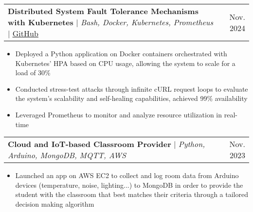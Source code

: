 \documentclass[letterpaper,11t]{article}
\makeatletter
\newcommand{\resumeItem}[1]{
  \item\small{
    {#1 \vspace{-2pt}}
  }
}
\newcommand{\resumeProjectHeading}[2]{
    \item
    \begin{tabular*}{0.97\textwidth}{l@{\extracolsep{\fill}}r}
      \small#1 & #2 \\
    \end{tabular*}\vspace{-7pt}
}
\newcommand{\resumeItemListStart}{\begin{itemize}}
\newcommand{\resumeItemListEnd}{\end{itemize}\vspace{-5pt}}
\makeatother
\begin{document}
        \resumeProjectHeading
        {\textbf{Distributed System Fault Tolerance Mechanisms with Kubernetes} $|$ \emph{Bash, Docker, Kubernetes, Prometheus} $|$ \href{https://github.com/Somnef/kubernetes-fault-tolerance}{\underline{GitHub}}}{Nov. 2024}
            \resumeItemListStart
                \resumeItem{Deployed a Python application on Docker containers orchestrated with Kubernetes' HPA based on CPU usage, allowing the system to scale for a load of 30\%}
                \resumeItem{Conducted stress-test attacks through infinite cURL request loops to evaluate the system's scalability and self-healing capabilities, achieved 99\% availability}
                \resumeItem{Leveraged Prometheus to monitor and analyze resource utilization in real-time}
            \resumeItemListEnd



        \resumeProjectHeading
        {\textbf{Cloud and IoT-based Classroom Provider} $|$ \emph{Python, Arduino, MongoDB, MQTT, AWS}}{Nov. 2023}
            \resumeItemListStart
                \resumeItem{Launched an app on AWS EC2 to collect and log room data from Arduino devices (temperature, noise, lighting...) to MongoDB in order to provide the student with the classroom that best matches their criteria through a tailored decision making algorithm }
            \resumeItemListEnd

          
\end{document}
